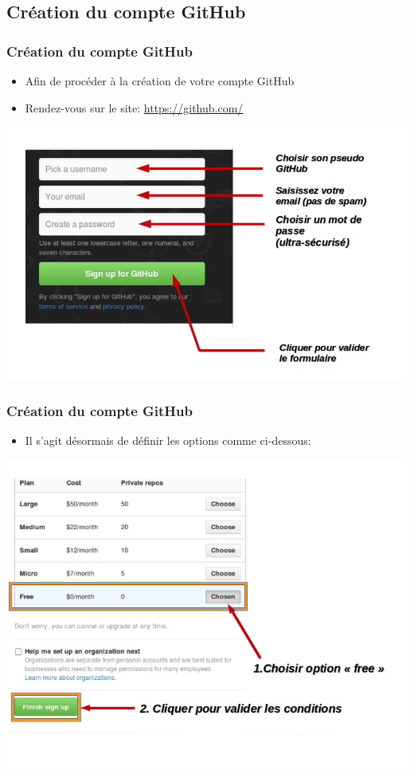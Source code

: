 \documentclass{beamer}
\begin{document}
\subsection{Cr\'eation du compte GitHub} %
\begin{frame}
\frametitle{Cr\'eation du compte GitHub}
\begin{itemize}
\item Afin de proc\'{e}der \`{a} la cr\'{e}ation de votre compte GitHub
\item Rendez-vous sur le site: \href{https://github.com/}{https://github.com/}
\end{itemize}
\includegraphics[scale=0.3]{git_hub_home1.png}
\end{frame}


\begin{frame}
\frametitle{Cr\'eation du compte GitHub}
\begin{itemize}
\item Il s'agit d\'{e}sormais de d\'{e}finir les options comme ci-dessous:
\end{itemize}
\includegraphics[scale=0.3]{GitHubfininsc.png}
\end{frame}
\end{document}
